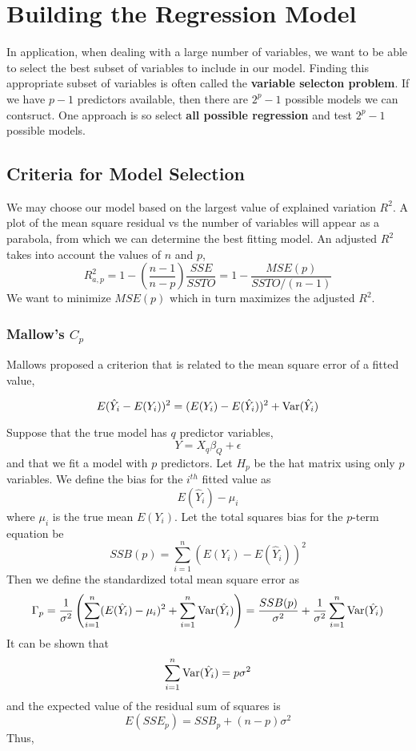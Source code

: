 \chapter{Building the Regression Model}

In application, when dealing with a large number of variables, we want to be able to select the best subset of variables to include in our model. Finding this appropriate subset of variables is often called the \textbf{variable selecton problem}. If we have $p-1$ predictors available, then there are $2^p -1$ possible models we can contsruct. One approach is so select \textbf{all possible regression} and test $2^{p} - 1$ possible models.

\section{Criteria for Model Selection}

We may choose our model based on the largest value of explained variation $R^2$. A plot of the mean square residual vs the number of variables will appear as a parabola, from which we can determine the best fitting model. An adjusted $R^2$ takes into account the values of $n$ and $p$, 
\[R^2_{a,p} = 1 - \left(\frac{n-1}{n-p}\right)\frac{SSE}{SSTO} = 1 - \frac{MSE(p)}{SSTO/(n-1)}\]
We want to minimize $MSE(p)$ which in turn maximizes the adjusted $R^2$. 

\subsection{Mallow's $C_p$} 

Mallows proposed a criterion that is related to the mean square error of a fitted value, 

\[E(\hat{Y}_i - E(Y_i))^2 = (E(Y_i) - E(\hat{Y}_i))^2 + \operatorname{Var}(\hat{Y}_i)\]

Suppose that the true model has $q$ predictor variables, 
\[Y = X_q\beta_Q + \epsilon\]
and that we fit a model with $p$ predictors. Let $H_p$ be the hat matrix using only $p$ variables. We define the bias for the $i^{th}$ fitted value as 
\[E(\hat{Y}_i) - \mu_i\]
where $\mu_i$ is the true mean $E(Y_i)$. Let the total squares bias for the $p$-term equation be 
\[SSB(p) = \sum_{i=1}^n (E(Y_i) - E(\hat{Y}_i))^2\]
Then we define the standardized total mean square error as 
\[\Gamma_p = \frac{1}{\sigma^2}\left(\sum_{i=1}^n (E(\hat{Y}_i) - \mu_i)^2 + \sum_{i=1}^n \operatorname{Var}(\hat{Y}_i)\right) = \frac{SSB(p)}{\sigma^2} + \frac{1}{\sigma^2}\sum_{i=1}^n \operatorname{Var}(\hat{Y}_i)\]
It can be shown that 
\[\sum_{i=1}^n \operatorname{Var}(\hat{Y}_i) = p\sigma^2\]
and the expected value of the residual sum of squares is 
\[E(SSE_p) = SSB_p + (n-p)\sigma^2\]
Thus,

